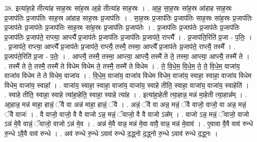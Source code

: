 \documentclass[17pt]{extarticle}
\begin{document}
38. इत्या॑हा॒हे तीत्या॑ह साह॒स्रः सा॑ह॒स्र आ॒हे तीत्या॑ह साह॒स्रः । . आ॒ह॒ सा॒ह॒स्रः सा॑ह॒स्र आ॑हाह साह॒स्रः प्र॒जाप॑तिः प्र॒जाप॑तिः साह॒स्र आ॑हाह साह॒स्रः प्र॒जाप॑तिः । . सा॒ह॒स्रः प्र॒जाप॑तिः प्र॒जाप॑तिः साह॒स्रः सा॑ह॒स्रः प्र॒जाप॑तिः प्र॒जाप॑तेः प्र॒जाप॑तेः प्र॒जाप॑तिः साह॒स्रः सा॑ह॒स्रः प्र॒जाप॑तिः प्र॒जाप॑तेः । . प्र॒जाप॑तिः प्र॒जाप॑तेः प्र॒जाप॑तेः प्र॒जाप॑तिः प्र॒जाप॑तिः प्र॒जाप॑ते॒ राप्त्या॒ आप्त्यै᳚ प्र॒जाप॑तेः प्र॒जाप॑तिः प्र॒जाप॑तिः प्र॒जाप॑ते॒ राप्त्यै᳚ । . प्र॒जाप॑ति॒रिति॑ प्र॒जा - प॒तिः॒ । . प्र॒जाप॑ते॒ राप्त्या॒ आप्त्यै᳚ प्र॒जाप॑तेः प्र॒जाप॑ते॒ राप्त्यै॒ तस्मै॒ तस्मा॒ आप्त्यै᳚ प्र॒जाप॑तेः प्र॒जाप॑ते॒ राप्त्यै॒ तस्मै᳚ । . प्र॒जाप॑ते॒रिति॑ प्र॒जा - प॒तेः॒ । . आप्त्यै॒ तस्मै॒ तस्मा॒ आप्त्या॒ आप्त्यै॒ तस्मै॑ ते ते॒ तस्मा॒ आप्त्या॒ आप्त्यै॒ तस्मै॑ ते । . तस्मै॑ ते ते॒ तस्मै॒ तस्मै॑ ते विधेम विधेम ते॒ तस्मै॒ तस्मै॑ ते विधेम । . ते॒ वि॒धे॒म॒ वि॒धे॒म॒ ते॒ ते॒ वि॒धे॒म॒ वाजा॑य॒ वाजा॑य विधेम ते ते विधेम॒ वाजा॑य । . वि॒धे॒म॒ वाजा॑य॒ वाजा॑य विधेम विधेम॒ वाजा॑य॒ स्वाहा॒ स्वाहा॒ वाजा॑य विधेम विधेम॒ वाजा॑य॒ स्वाहा᳚ । . वाजा॑य॒ स्वाहा॒ स्वाहा॒ वाजा॑य॒ वाजा॑य॒ स्वाहे तीति॒ स्वाहा॒ वाजा॑य॒ वाजा॑य॒ स्वाहेति॑ । . स्वाहे तीति॒ स्वाहा॒ स्वाहे त्या॑हा॒हेति॒ स्वाहा॒ स्वाहे त्या॑ह । . इत्या॑हा॒हेती त्या॒हान्न॒ मन्न॑ मा॒हेती त्या॒हान्न᳚म् । . आ॒हान्न॒ मन्न॑ माहा॒ हान्नं॒ ॅवै वा अन्न॑ माहा॒ हान्नं॒ ॅवै । . अन्नं॒ ॅवै वा अन्न॒ मन्नं॒ ॅवै वाजो॒ वाजो॒ वा अन्न॒ मन्नं॒ ॅवै वाजः॑ । . वै वाजो॒ वाजो॒ वै वै वाजो ऽन्न॒ मन्नं॒ ॅवाजो॒ वै वै वाजो ऽन्न᳚म् । . वाजो ऽन्न॒ मन्नं॒ ॅवाजो॒ वाजो ऽन्न॑ मे॒वै वान्नं॒ ॅवाजो॒ वाजो ऽन्न॑ मे॒व । . अन्न॑ मे॒वै वान्न॒ मन्न॑ मे॒वा वावै॒ वान्न॒ मन्न॑ मे॒वाव॑ । . ए॒वावा वै॒वै वाव॑ रुन्धे रु॒न्धे ऽवै॒वै वाव॑ रुन्धे । . अव॑ रुन्धे रु॒न्धे ऽवाव॑ रुन्धे द॒द्ध्नो द॒द्ध्नो रु॒न्धे ऽवाव॑ रुन्धे द॒द्ध्नः । \newline
\pagebreak
{}
\end{document}
